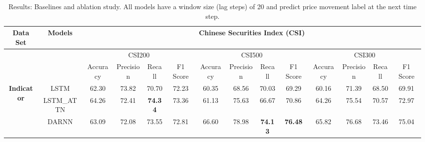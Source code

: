 \documentclass[sigconf]{acmart}
\begin{document}
\begin{table}[t]
\centering
\small
\setlength\tabcolsep{2pt}
\caption{Results: Baselines and ablation study. All models have a
  window size (lag steps) of 20 and predict price movement label
  at the next time step.}
\begin{tabular}{@{}cccccccccccccc@{}}
\toprule
Data Set                   & Models                          & \multicolumn{12}{c}{Chinese Securities Index (CSI)}                                                                                                                                                                                                    \\ \midrule
\multicolumn{2}{c}{\multirow{2}{*}{}}                        & \multicolumn{4}{c}{CSI200}                                                                & \multicolumn{4}{c}{CSI500}                                                             & \multicolumn{4}{c}{CSI300}                                        \\
\multicolumn{2}{c}{}                                         & Accuracy                   & Precision      & Recall         & F1 Score                   & Accuracy       & Precision      & Recall         & F1 Score                            & Accuracy       & Precision      & Recall         & F1 Score       \\ \cmidrule(r){1-2} \cmidrule(lr){4-5} \cmidrule(lr){8-9} \cmidrule(lr){12-13}
\multirow{3}{*}{\textbf{Indicator}} & LSTM                            & 62.30                      & 73.82          & 70.70          & 72.23                      & 60.35          & 68.56          & 70.03          & 69.29                               & 60.16          & 71.39          & 68.50          & 69.91          \\
                           & \multicolumn{1}{c|}{LSTM\_ATTN} & 64.26                      & 72.41          & \textbf{74.34} & \multicolumn{1}{c|}{73.36} & 61.13          & 75.63          & 66.67          & \multicolumn{1}{c|}{70.86}          & 64.26          & 75.54          & 70.57          & 72.97          \\
                           & DARNN                           & 63.09 & 72.08          & 73.55          & 72.81                      & 66.60          & 78.98          & \textbf{74.13}          & \textbf{76.48}                               & 65.82          & 76.68          & 73.46          & 75.04          \\ \cmidrule(r){1-2} \cmidrule(lr){4-5} \cmidrule(lr){8-9} \cmidrule(lr){12-13}

\end{tabular}
\end{table}
\end{document}

